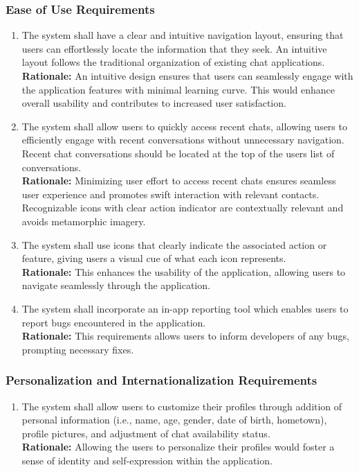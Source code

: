 \documentclass[]{article}
\begin{document}
\subsubsection{Ease of Use Requirements}
\label{ssub:ease_of_use_requirements}
\begin{enumerate}[{UH-EOU}1. ]
    \item The system shall have a clear and intuitive navigation layout, ensuring that users can effortlessly locate 
    the information that they seek. An intuitive layout follows the traditional organization of existing chat applications. \\
    {\bf Rationale:} An intuitive design ensures that users can seamlessly engage with the application features with minimal learning curve. 
    This would enhance overall usability and contributes to increased user satisfaction. 
    \item The system shall allow users to quickly access recent chats, allowing users to efficiently engage with recent 
    conversations without unnecessary navigation. Recent chat conversations should be located at the top of the users list of conversations.\\
    {\bf Rationale:} Minimizing user effort to access recent chats ensures seamless user experience and promotes swift interaction 
    with relevant contacts. Recognizable icons with clear action indicator are contextually relevant and avoids metamorphic imagery. 
    \item The system shall use icons that clearly indicate the associated action or feature, giving users a visual cue of what each icon represents. \\
    {\bf Rationale:} This enhances the usability of the application, allowing users to navigate seamlessly through the application. 
    \item The system shall incorporate an in-app reporting tool which enables users to report bugs encountered in the application.\\
    {\bf Rationale:} This requirements allows users to inform developers of any bugs, prompting necessary fixes.
\end{enumerate} 
\subsubsection{Personalization and Internationalization Requirements}
\label{ssub:personalization_and_internationalization_requirements}
\begin{enumerate}[{UH-PI}1. ]
    \item The system shall allow users to customize their profiles through addition of personal information (i.e., name, age, gender, date of birth, hometown), profile pictures, and adjustment of chat availability status. \\
    {\bf Rationale:} Allowing the users to personalize their profiles would foster a sense of identity and self-expression within the application.
\end{enumerate}
\end{document}
